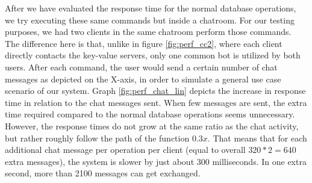 After we have evaluated the response time for the normal database operations, we try executing these same commands but inside a chatroom. For our testing purposes, we had two clients in the same chatroom perform those commands. The difference here is that, unlike in figure \ref{fig:perf_cc2}, where each client directly contacts the key-value servers, only one common bot is utilized by both users. After each command, the user would send a certain number of chat messages as depicted on the X-axis, in order to simulate a general use case scenario of our system. Graph \ref{fig:perf_chat_lin} depicts the increase in response time in relation to the chat messages sent.
When few messages are sent, the extra time required compared to the normal database operations seems unnecessary. 
However, the response times do not grow at the same ratio as the chat activity, but rather roughly follow the path of the function \begin{math}0.3x\end{math}. That means that for each additional chat message per operation per client (equal to overall \begin{math}320 * 2 = 640\end{math} extra messages), the system is slower by just about 300 milliseconds. In one extra second, more than 2100 messages can get exchanged.